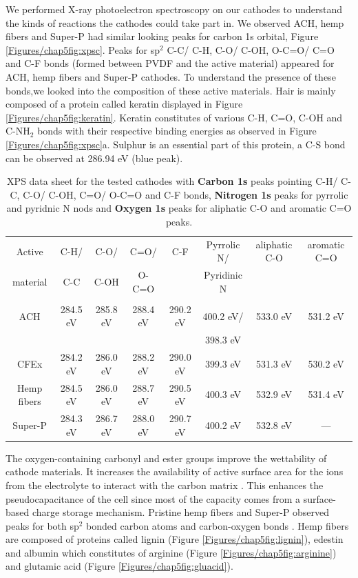 We performed X-ray photoelectron spectroscopy on our cathodes to understand the kinds of reactions the cathodes could take part in. We observed ACH, hemp fibers and Super-P had similar looking peaks for carbon 1s orbital, Figure \ref{Figures/chap5fig:xpsc}. Peaks for sp$^2$ C-C/ C-H, C-O/ C-OH, O-C=O/ C=O and C-F bonds (formed between PVDF and the active material) appeared for ACH, hemp fibers and Super-P cathodes. To understand the presence of these bonds,we looked into the composition of these active materials. Hair is mainly composed of a protein called keratin displayed in Figure \ref{Figures/chap5fig:keratin}. Keratin constitutes of various C-H, C=O, C-OH and C-NH$_2$ bonds with their respective binding energies as observed in Figure \ref{Figures/chap5fig:xpsc}a. Sulphur is an essential part of this protein, a C-S bond can be observed at 286.94 eV (blue peak). 
\begin{table}
\caption{XPS data sheet for the tested cathodes with \textbf{Carbon 1s} peaks pointing C-H/ C-C, C-O/ C-OH, C=O/ O-C=O and C-F bonds, \textbf{Nitrogen 1s} peaks for pyrrolic and pyridnic N nods and \textbf{Oxygen 1s} peaks for aliphatic C-O and aromatic C=O peaks.} \label{table2}
\begin{tabular}{cccccccc}
\hline
Active & C-H/ & C-O/ & C=O/ & C-F & Pyrrolic N/ & aliphatic C-O & aromatic C=O\\
material & C-C & C-OH & O-C=O & & Pyridinic N & & \\
\hline\\
ACH & 284.5 eV & 285.8 eV & 288.4 eV & 290.2 eV & 400.2 eV/ & 533.0 eV & 531.2 eV\\
& & & & & 398.3 eV & & \\
CFEx & 284.2 eV & 286.0 eV & 288.2 eV & 290.0 eV & 399.3 eV & 531.3 eV & 530.2 eV\\
Hemp fibers & 284.5 eV & 286.0 eV & 288.7 eV & 290.5 eV & 400.3 eV & 532.9 eV & 531.4 eV\\
Super-P & 284.3 eV & 286.7 eV & 288.0 eV & 290.7 eV & 400.2 eV & 532.8 eV & ---\\
\hline
\end{tabular}
\end{table}
The oxygen-containing carbonyl and ester groups improve the wettability of cathode materials. It increases the availability of active surface area for the ions from the electrolyte to interact with the carbon matrix \cite{younesi_analysis_2015}. This enhances the pseudocapacitance of the cell since most of the capacity comes from a surface-based charge storage mechanism. Pristine hemp fibers and Super-P observed peaks for both sp$^2$ bonded carbon atoms and carbon-oxygen bonds \cite{hussain_development_2019}. Hemp fibers are composed of proteins called lignin (Figure \ref{Figures/chap5fig:lignin}), edestin and albumin which constitutes of arginine (Figure \ref{Figures/chap5fig:arginine}) and glutamic acid (Figure \ref{Figures/chap5fig:gluacid}).  

